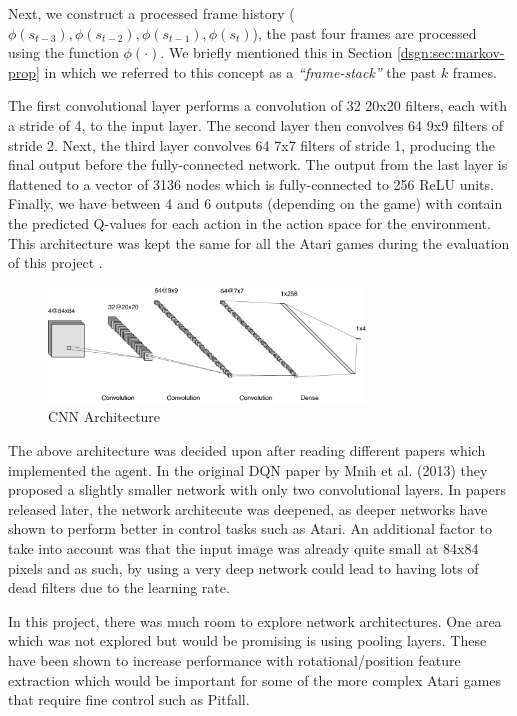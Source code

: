 Next, we construct a processed frame history ($\phi(s_{t-3}), \phi(s_{t-2}), \phi(s_{t-1}), \phi(s_t)$), the past four frames are processed using the function $\phi(\cdot)$. We briefly mentioned this in Section \ref{dsgn:sec:markov-prop} in which we referred to this concept as a \textit{``frame-stack''} the past $k$ frames.

The first convolutional layer performs a convolution of 32 20x20 filters, each with a stride of 4, to the input layer. The second layer then convolves 64 9x9 filters of stride 2. Next, the third layer convolves 64 7x7 filters of stride 1, producing the final output before the fully-connected network. The output from the last layer is flattened to a vector of 3136 nodes which is fully-connected to 256 ReLU units. Finally, we have between 4 and 6 outputs (depending on the game) with contain the predicted Q-values for each action in the action space for the environment. This architecture was kept the same for all the Atari games during the evaluation of this project \cite{dqn}.

\begin{figure}[htbp]
	\centering
	\includegraphics[width=0.75\textwidth]{chapters/chapter4/images/cnn.png}
	\caption{CNN Architecture
		\label{fig:project-dqn}
	}
\end{figure}

The above architecture was decided upon after reading different papers which implemented the agent. In the original DQN paper by Mnih et al. (2013) \cite{dqn} they proposed a slightly smaller network with only two convolutional layers. In papers released later, the network architecute was deepened, as deeper networks have shown to perform better in control tasks such as Atari. An additional factor to take into account was that the input image was already quite small at 84x84 pixels and as such, by using a very deep network could lead to having lots of dead filters due to the learning rate.

In this project, there was much room to explore network architectures. One area which was not explored but would be promising is using pooling layers. These have been shown to increase performance with rotational/position feature extraction which would be important for some of the more complex Atari games that require fine control such as Pitfall.

